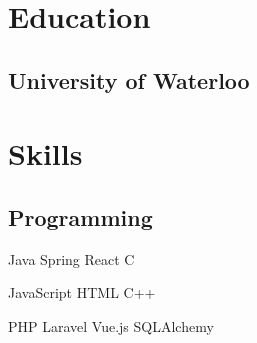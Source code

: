 \documentclass[letterpaper]{deedy-resume} %
\begin{document}
\vspace{-10pt}
\begin{minipage}[t]{0.33\textwidth} %


\sectionspace
\section{Education} 

\subsection{University of Waterloo}

\vspace{2pt}


\vspace{5pt}

\section{Skills}
\subsection{Programming}


 \newline
   \textbullet{}Java
   \textbullet{}Spring
   \textbullet{}React
   \textbullet{} C
   
\textbullet{}JavaScript
  \textbullet{} HTML
    \textbullet{} C++
    
     \newline{}

\textbullet{}  PHP
\textbullet{}Laravel
\textbullet{} Vue.js
 \textbullet{} SQLAlchemy 


\end{minipage}
\end{document}
